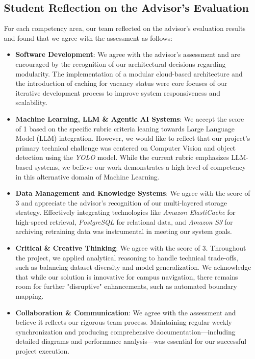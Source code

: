 \subsection{Student Reflection on the Advisor's Evaluation}
\label{student-reflection-advisor-evaluation}
For each competency area, our team reflected on the advisor's evaluation results and found that we agree with the assessment as follows:
\begin{itemize}[itemsep=0.2em, topsep=0.2em, parsep=0pt, partopsep=0pt]
    \item \textbf{Software Development}: We agree with the advisor's assessment and are encouraged by the recognition of our architectural decisions regarding modularity. The implementation of a modular cloud-based architecture and the introduction of caching for vacancy status were core focuses of our iterative development process to improve system responsiveness and scalability.
    \item \textbf{Machine Learning, LLM \& Agentic AI Systems}: We accept the score of 1 based on the specific rubric criteria leaning towards Large Language Model (LLM) integration. However, we would like to reflect that our project's primary technical challenge was centered on Computer Vision and object detection using the \textit{YOLO} model. While the current rubric emphasizes LLM-based systems, we believe our work demonstrates a high level of competency in this alternative domain of Machine Learning.
    \item \textbf{Data Management and Knowledge Systems}: We agree with the score of 3 and appreciate the advisor's recognition of our multi-layered storage strategy. Effectively integrating technologies like \textit{Amazon ElastiCache} for high-speed retrieval, \textit{PostgreSQL} for relational data, and \textit{Amazon S3} for archiving retraining data was instrumental in meeting our system goals.
    \item \textbf{Critical \& Creative Thinking}: We agree with the score of 3. Throughout the project, we applied analytical reasoning to handle technical trade-offs, such as balancing dataset diversity and model generalization. We acknowledge that while our solution is innovative for campus navigation, there remains room for further "disruptive" enhancements, such as automated boundary mapping.
    \item \textbf{Collaboration \& Communication}: We agree with the assessment and believe it reflects our rigorous team process. Maintaining regular weekly synchronization and producing comprehensive documentation—including detailed diagrams and performance analysis—was essential for our successful project execution.
\end{itemize}